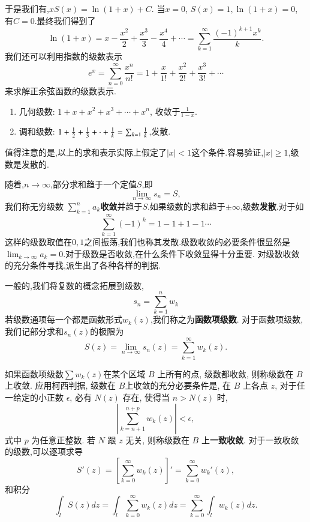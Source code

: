 于是我们有,$
    x S(x) = \ln (1 + x) + C .$
当$x=0$, $S(x) = 1, \ln (1+x) = 0$, 有$C=0$.最终我们得到了
\begin{equation}
    \ln (1+x) = x -  \frac{x^2}{2} + \frac{x^3}{3} - \frac{x^4}{4} + \cdots = \sum_{k=1}^{\infty} \frac{(-1)^{k+1} x^k}{k} .
\end{equation}
我们还可以利用指数的级数表示
\begin{equation}
    e^{x} = \sum_{n=0}^{\infty} \frac{x^n}{n!} = 1 + \frac{x}{1!} + \frac{x^2}{2!} + \frac{x^3}{3!} + \cdots 
\end{equation}
来求解正余弦函数的级数表示.
\begin{enumerate}
    \item 几何级数: $ 1 + x + x^2 + x^3 + \cdots + x^n$, 收敛于$\frac{1}{1-x}$.
    \item 调和级数: $ 1 + {\frac{1}{2}} + \frac{1}{3} + \cdot +\frac{1}{k} = \sum_{k=1} \frac{1}{k}$,发散.
\end{enumerate}

值得注意的是,以上的求和表示实际上假定了$|x|<1$这个条件.容易验证,$|x|\geq 1$,级数是发散的.

随着,$n\to \infty$,部分求和趋于一个定值$S$,即
\begin{equation}
    \lim_{n\to \infty} s_n = S ,
\end{equation}
我们称无穷级数 $\sum_{k=1}^{n} a_{k}${\bf 收敛}并趋于$S$.如果级数的求和趋于$\pm \infty$,级数{\bf 发散}.对于如
\begin{equation}
    \sum_{k=1}^{\infty} (-1)^k = 1 - 1 + 1 - 1 \cdots 
\end{equation}
这样的级数取值在$0,1$之间振荡,我们也称其发散.级数收敛的必要条件很显然是$\lim_{k\to \infty} a_k = 0$.对于级数是否收敛,在什么条件下收敛显得十分重要.
对级数收敛的充分条件寻找,派生出了各种各样的判据.

一般的,我们将复数的概念拓展到级数,
\begin{equation}
    s_n = \sum_{k=1}^{n} w_{k}
\end{equation}
若级数通项每一个都是函数形式$w_k(z)$,我们称之为\textbf{函数项级数}.
对于函数项级数,我们记部分求和$s_n(z)$的极限为
\begin{equation}
    S(z) = \lim_{n\to \infty} s_n(z) =  \sum_{k=1}^{\infty} w_k (z). 
\end{equation}


如果函数项级数$\sum w_k(z)$在某个区域 $B$ 上所有的点, 级数都收敛, 则称级数在 $B$ 上收敛. 应用柯西判据, 级数在 $B$上收敛的充分必要条件是, 在 $B$ 上各点 $z$, 对于任一给定的小正数 $\epsilon$, 必有 $N(z)$ 存在, 使得当 $n>N(z)$ 时,
$$
\left|\sum_{k=n+1}^{n+p} w_k(z)\right|<\epsilon,
$$
式中 $p$ 为任意正整数. 若 $N$ 跟 $z$ 无关, 则称级数在 $B$ 上\textbf{一致收敛}.
对于一致收敛的级数,可以逐项求导
$$
S' (z) = [ \sum_{k=0}^{\infty} w_k(z)]' =\sum_{k=0}^{\infty}  w_k'(z),
$$
和积分
$$
\int_l S(z) dz = \int_l \sum_{k=0}^{\infty} w_k(z) dz=\sum_{k=0}^{\infty} \int_l w_k(z) dz .
$$
